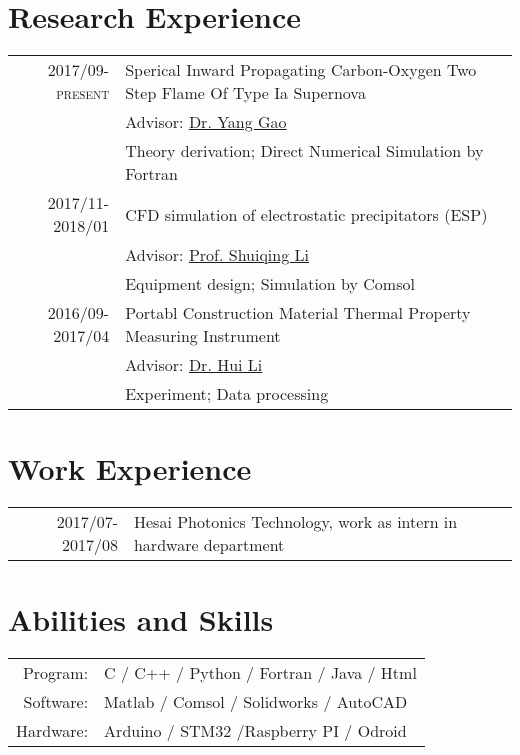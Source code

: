 \documentclass[a4paper,10pt]{article}
\begin{document}
\section{Research Experience}
\begin{tabular}{rl}
\textsc{2017/09-present} & Sperical Inward Propagating Carbon-Oxygen Two Step Flame Of Type Ia Supernova \\
                         & \small Advisor: \href{http://www.tsinghua.edu.cn/publish/teen/2472/2016/20160429193334896914447/20160429193334896914447_.html}{Dr. Yang Gao} \\
                         & Theory derivation; Direct Numerical Simulation by Fortran \\
\textsc{2017/11-2018/01} & CFD simulation of electrostatic precipitators (ESP)\\
                         & \small Advisor: \href{http://www.tsinghua.edu.cn/publish/teen/2472/2010/20101222191303970621540/20101222191303970621540_.html}{Prof. Shuiqing Li} \\
                         & Equipment design; Simulation by Comsol \\
\textsc{2016/09-2017/04} & Portabl Construction Material Thermal Property Measuring Instrument \\
                         & \small Advisor: \href{http://www.tsinghua.edu.cn/publish/te/2230/2017/20170816112830349410941/20170816112830349410941_.html}{Dr. Hui Li} \\
                         & Experiment; Data processing \\
\end{tabular}

\section{Work Experience}
\begin{tabular}{rl}
\textsc{2017/07-2017/08} &  Hesai Photonics Technology, work as intern in hardware department \\
\end{tabular}

\section{Abilities and Skills}
\begin{tabular}{rl}
Program:  & C / C++ / Python / Fortran / Java / Html \\
Software: & Matlab / Comsol / Solidworks / AutoCAD   \\
Hardware: & Arduino / STM32 /Raspberry PI / Odroid   \\
\end{tabular}
\end{document}
